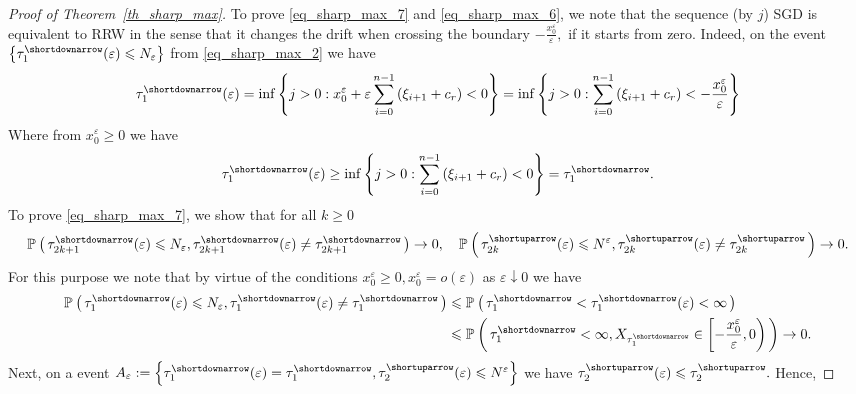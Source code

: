 \documentclass{article}
\theoremstyle{plain}
\theoremstyle{definition}
\theoremstyle{remark}
\newcommand{\p}[2][]{{\mathbb{P}}_{#1} \left( \, #2 \, \right) } %
\newcommand{\ra }{ \rightarrow} %
\newcommand{\skk}[1]{\left\{ #1 \right\}} %
\begin{document}
\begin{proof}[Proof of Theorem~\ref{th_sharp_max}]
To prove \eqref{eq_sharp_max_7} and \eqref{eq_sharp_max_6}, we note that the sequence (by $j$) SGD is equivalent to RRW in the sense that it changes the drift when crossing the boundary $-\frac{x_0^{\varepsilon}}{\varepsilon},$ 
if it starts from zero. Indeed, on the event $\skk{\tau_{1}^{\shortdownarrow}(\varepsilon) \leqslant N_{\varepsilon}}$ from \eqref{eq_sharp_max_2}  we have
\begin{equation*}
\tau_{1}^{\shortdownarrow}(\varepsilon)  =\inf \left\{j>0: x_0^{\varepsilon} + \varepsilon \sum_{i=0}^{n-1}\left(\xi_{i+1} + c_r \right)  <0\right\} = \inf \left\{j>0:  \sum_{i=0}^{n-1}\left(\xi_{i+1} + c_r\right) < - \frac{x_0^{\varepsilon}}{\varepsilon}\right\}
\end{equation*}
Where from $x_0^{\varepsilon} \geq 0$ we have
\begin{equation}\label{eq_sharp_max_10}
\tau_{1}^{\shortdownarrow}(\varepsilon)  \geq \inf \left\{j>0:  \sum_{i=0}^{n-1}\left(\xi_{i+1} + c_r\right) < 0\right\}  = \tau_{1}^{\shortdownarrow}.
\end{equation}
%
To prove \eqref{eq_sharp_max_7}, we show that for all $k \geq 0$
\begin{equation}\label{eq_sharp_max_11}
    \p{ \tau_{2k+1}^{\shortdownarrow}(\varepsilon) \leqslant N_{\varepsilon}, \tau_{2k+1}^{\shortdownarrow}(\varepsilon) \neq \tau_{2k+1}^{\shortdownarrow} }  \ra 0, \quad \p{ \tau_{2k}^{\shortuparrow}(\varepsilon) \leqslant N^{\varepsilon}, \tau_{2k}^{\shortuparrow}(\varepsilon) \neq \tau_{2k}^{\shortuparrow} }  \ra 0.
\end{equation}
For this purpose we note that by virtue of the conditions $x_{0}^{\varepsilon} \geq 0, x_{0}^{\varepsilon}  = o(\varepsilon) $ as $\varepsilon \downarrow 0$ we have
\begin{equation*}
\begin{split}
\p{ \tau_{1}^{\shortdownarrow}(\varepsilon) \leqslant N_{\varepsilon}, \tau_{1}^{\shortdownarrow}(\varepsilon) \neq \tau_{1}^{\shortdownarrow} }  & \leqslant  \p{ \tau_{1}^{\shortdownarrow}<  \tau_{1}^{\shortdownarrow}(\varepsilon) < \infty } \\  & \leqslant  \p{\tau_{1}^{\shortdownarrow}< \infty,  X_{\tau_{1}^{\shortdownarrow}} \in  \left[-\frac{x_0^{\varepsilon}}{\varepsilon}, 0\right)}  \ra 0.
\end{split}
\end{equation*}
Next, on a event $A_{\varepsilon}:=\skk{ \tau_{1}^{\shortdownarrow}(\varepsilon)  = \tau_{ 1}^{\shortdownarrow}, \tau_{2}^{\shortuparrow}(\varepsilon) \leqslant N^{\varepsilon}}$ we have $\tau_{2}^{\shortuparrow}(\varepsilon) \leqslant \tau_{2}^{\shortuparrow}.$ Hence, 

\end{proof}
\end{document}

